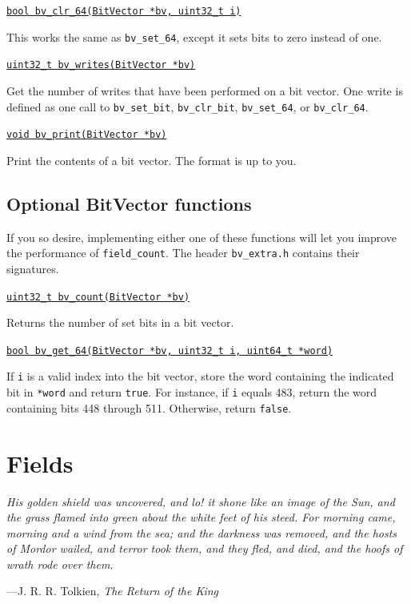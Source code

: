 \documentclass[11pt]{article}
\begin{document}
\underline{\texttt{bool bv\_clr\_64(BitVector *bv, uint32\_t i)}}

This works the same as \texttt{bv\_set\_64}, except it sets bits to zero instead of one.
\medskip

\underline{\texttt{uint32\_t bv\_writes(BitVector *bv)}}

Get the number of writes that have been performed on a bit vector. One write is defined as one call to \texttt{bv\_set\_bit}, \texttt{bv\_clr\_bit}, \texttt{bv\_set\_64}, or \texttt{bv\_clr\_64}.
\medskip

\underline{\texttt{void bv\_print(BitVector *bv)}}

Print the contents of a bit vector. The format is up to you.

\setlength{\parindent}{17pt}
\setlength{\parskip}{0pt plus1pt}

\subsection{Optional BitVector functions}

\noindent
If you so desire, implementing either one of these functions will let you improve the performance of \texttt{field\_count}. The header \texttt{bv\_extra.h} contains their signatures.

\setlength{\parindent}{0pt}
\setlength{\parskip}{6pt}

\underline{\texttt{uint32\_t bv\_count(BitVector *bv)}}

Returns the number of set bits in a bit vector.
\medskip

\underline{\texttt{bool bv\_get\_64(BitVector *bv, uint32\_t i, uint64\_t *word)}}

If \texttt{i} is a valid index into the bit vector, store the word containing the indicated bit in \texttt{*word} and return \texttt{true}. For instance, if \texttt{i} equals 483, return the word containing bits 448 through 511. Otherwise, return \texttt{false}.

\setlength{\parindent}{17pt}
\setlength{\parskip}{0pt plus1pt}

\section{Fields}

\epigraph{\emph{His golden shield was uncovered, and lo! it shone like an image of the Sun, and the grass flamed into green about the white feet of his steed. For morning came, morning and a wind from the sea; and the darkness was removed, and the hosts of Mordor wailed, and terror took them, and they fled, and died, and the hoofs of wrath rode over them.}}{---J. R. R. Tolkien, \emph{The Return of the King}}
\end{document}
